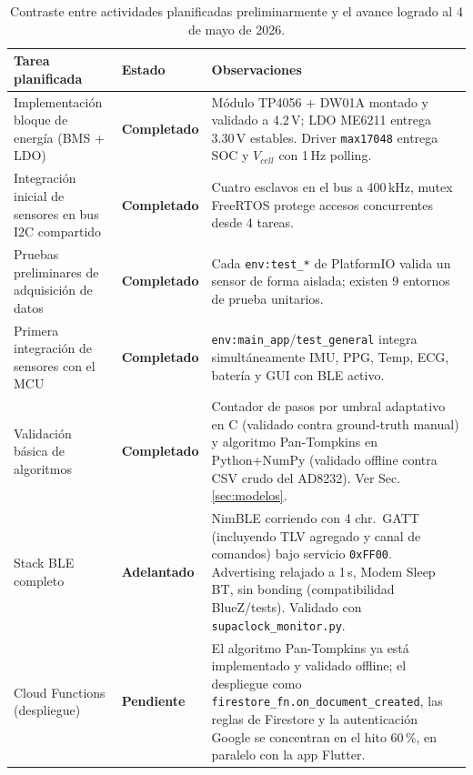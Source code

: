 \documentclass[letterpaper,11pt]{article}
\begin{document}
\begin{table}[H]
    \centering
    \caption{Contraste entre actividades planificadas preliminarmente
    y el avance logrado al 4 de mayo de 2026.}
    \label{tab:gantt25}
    \footnotesize
    \begin{tabular}{|L{4.0cm}|L{2.4cm}|L{8.0cm}|}\hline
    \textbf{Tarea planificada} & \textbf{Estado} & \textbf{Observaciones} \\\hline
     Implementación bloque de energía (BMS + LDO) & \bf Completado & Módulo TP4056 + DW01A montado y validado a 4.2\,V; LDO ME6211 entrega 3.30\,V estables. Driver \texttt{max17048} entrega SOC y $V_{cell}$ con 1\,Hz polling. \\\hline
     Integración inicial de sensores en bus I2C compartido & \bf Completado & Cuatro esclavos en el bus a 400\,kHz, mutex FreeRTOS protege accesos concurrentes desde 4 tareas.  \\\hline
     Pruebas preliminares de adquisición de datos & \bf Completado & Cada \texttt{env:test\_*} de PlatformIO valida un sensor de forma aislada; existen 9 entornos de prueba unitarios. \\\hline
     Primera integración de sensores con el MCU & \bf Completado & \texttt{env:main\_app}/\texttt{test\_general} integra simultáneamente IMU, PPG, Temp, ECG, batería y GUI con BLE activo. \\\hline
     Validación básica de algoritmos & \bf Completado & Contador de pasos por umbral adaptativo en C (validado contra ground-truth manual) y algoritmo Pan-Tompkins en Python+NumPy (validado offline contra CSV crudo del AD8232). Ver Sec.\,\ref{sec:modelos}. \\\hline
     Stack BLE completo & \bf Adelantado & NimBLE corriendo con 4 chr.\ GATT (incluyendo TLV agregado y canal de comandos) bajo servicio \texttt{0xFF00}. Advertising relajado a 1\,s, Modem Sleep BT, sin bonding (compatibilidad BlueZ/tests). Validado con \texttt{supaclock\_monitor.py}. \\\hline
     Cloud Functions (despliegue) & \bf Pendiente & El algoritmo Pan-Tompkins ya está implementado y validado offline; el despliegue como \texttt{firestore\_fn.on\_document\_created}, las reglas de Firestore y la autenticación Google se concentran en el hito 60\,\%, en paralelo con la app Flutter. \\\hline

\end{tabular}
\end{table}
\end{document}

